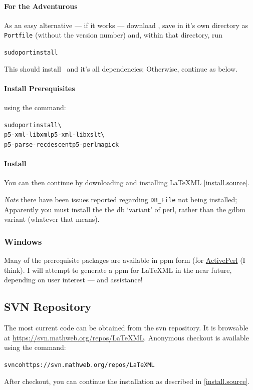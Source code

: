 \documentclass{article}
\begin{document}
\paragraph{For the Adventurous}  As an easy alternative --- if it works ---
download \CurrentMacOS, save in it's own directory as \texttt{Portfile}
(without the version number) and, within that directory, run
\begin{alltt}
  sudo port install
\end{alltt}
This should install \LaTeXML\ and it's all dependencies;
Otherwise, continue as below.
\paragraph{Install Prerequisites} using the command:
\begin{alltt}
  sudo port install    \textbackslash\\
      p5-xml-libxml p5-xml-libxslt  \textbackslash\\
      p5-parse-recdescent p5-perlmagick
\end{alltt}
\paragraph{Install}
You can then continue by downloading and installing LaTeXML \ref{install.source}.

\emph{Note} there have been issues reported regarding \verb|DB_File|
not being installed;  Apparently you must install the 
the db `variant' of perl, rather than the gdbm variant
(whatever that means).

\subsubsection{Windows}\label{install.windows}
Many of the prerequisite packages are available in
ppm form (for \href{http://activestate.com/}{ActivePerl} (I think).
I will attempt to generate a ppm for LaTeXML in the near
future, depending on user interest --- and assistance!

\subsection{SVN Repository}\label{download.svn}
The most current code can be obtained from the svn repository.
It is browsable at \url{https://svn.mathweb.org/repos/LaTeXML}.
Anonymous checkout is available using the command:
\begin{alltt}
  svn co https://svn.mathweb.org/repos/LaTeXML
\end{alltt}
After checkout, you can continue the installation
as described in \ref{install.source}.
\end{document}
